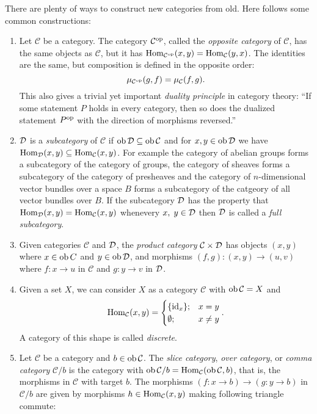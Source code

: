 \documentclass[a4paper,openany]{scrbook}
\renewcommand{\C}{\mathcal C}
\begin{document}
\begin{example}
There are plenty of ways to construct new categories from old. Here follows some common constructions:
\begin{enumerate}[label=(\alph*)]
\item Let $\C$ be a category. The category $\C^\op$, called the \emph{opposite category} of $\C$, has the same objects as $\C$, but it has $\Hom_{\C^\op}(x,y) = \Hom_\C(y,x)$. The identities are the same, but composition is defined in the opposite order:
\[
\mu_{\C^\op}(g,f) = \mu_\C(f,g).
\]
This also gives a trivial yet important \emph{duality principle} in category theory:
``If some statement $P$ holds in every category, then so does the dualized statement $P^{\op}$ with the direction of morphisms reversed.''
\item $\D$ is a \emph{subcategory} of $\C$ if $\ob \D \subseteq \ob \C$ and for $x,y \in \ob \D$ we have $\Hom_{\D}(x,y) \subseteq \Hom_{\C}(x,y)$. For example the category of abelian groups forms a subcategory of the category of groups, the category of sheaves forms a subcategory of the category of presheaves and the category of $n$-dimensional vector bundles over a space $B$ forms a subcategory of the catgeory of all vector bundles over $B$. If the subcategory $\D$ has the property that $\Hom_\D(x,y)=\Hom_\C(x,y)$ whenevery $x,\;y \in \D$ then $\D$ is called a \emph{full subcategory}.
\item Given categories $\C$ and $\D$, the \emph{product category} $\C \times \D$ has objects $(x,y)$ where $x \in \ob C$ and $y \in \ob \D$, and morphisms $(f,g):(x,y) \to (u,v)$ where $f:x \to u$ in $\C$ and $g:y \to v$ in $\D$.
\item Given a set $X$, we can consider $X$ as a category $\C$ with $\ob \C=X$ and
\[
\Hom_\C(x,y) = \begin{cases} \{\id_x\}; & x=y\\ \emptyset; & x \neq y\end{cases}.
\] A category of this shape is called \emph{discrete}.
\item Let $\C$ be a category and $b \in \ob \C$. The \emph{slice category}, \emph{over category}, or \emph{comma category} $\C / b$ is the category with $\ob \C/b = \Hom_{\C}(\ob \C, b)$, that is, the morphisms in $\C$ with target $b$. The morphisms $(f\colon x \to b) \to (g\colon y \to b)$ in $\C/b$ are given by morphisms $h \in \Hom_{\C}(x,y)$ making following triangle commute:
\begin{center}
\begin{tikzpicture}[description/.style={fill=white,inner sep=2pt}]

\end{tikzpicture}
\end{center}
\end{enumerate}
\end{example}
\end{document}
